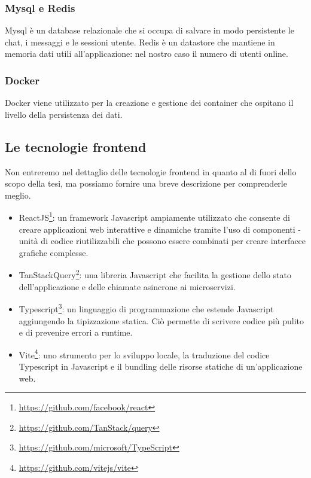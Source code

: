 \subsubsection{Mysql e Redis}
Mysql è un database relazionale che si occupa di salvare in modo persistente le chat, i messaggi e le sessioni utente.
Redis è un datastore che mantiene in memoria dati utili all'applicazione: nel nostro caso il numero di utenti online.

\subsubsection{Docker}
Docker viene utilizzato per la creazione e gestione dei container che ospitano il livello della persistenza dei dati.

\subsection{Le tecnologie frontend}
Non entreremo nel dettaglio delle tecnologie frontend in quanto al di fuori dello scopo della tesi, ma possiamo fornire
una breve descrizione per comprenderle meglio.

\begin{itemize}
    \item ReactJS\footnote{\url{https://github.com/facebook/react}}: un framework Javascript ampiamente utilizzato che
    consente di creare applicazioni web interattive e dinamiche tramite l'uso di componenti - unità di codice
    riutilizzabili che possono essere combinati per creare interfacce grafiche complesse.
    \item TanStackQuery\footnote{\url{https://github.com/TanStack/query}}: una libreria Javascript che facilita la
    gestione dello stato dell'applicazione e delle chiamate asincrone ai microservizi.
    \item Typescript\footnote{\url{https://github.com/microsoft/TypeScript}}: un linguaggio di programmazione che
    estende Javascript aggiungendo la tipizzazione statica. Ciò permette di scrivere codice più pulito e di prevenire
    errori a runtime.
    \item Vite\footnote{\url{https://github.com/vitejs/vite}}: uno strumento per lo sviluppo locale, la traduzione del
    codice Typescript in Javascript e il bundling delle risorse statiche di un'applicazione web.
\end{itemize}

